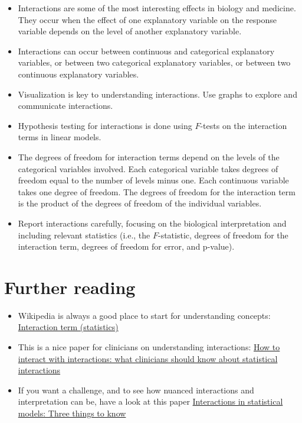 \documentclass[
  letterpaper,
  8pt,
  a4paper]{book}
\providecommand{\tightlist}{%
  \setlength{\itemsep}{0pt}\setlength{\parskip}{0pt}}
\begin{document}

\begin{itemize}
\tightlist
\item
  Interactions are some of the most interesting effects in biology and
  medicine. They occur when the effect of one explanatory variable on
  the response variable depends on the level of another explanatory
  variable.
\item
  Interactions can occur between continuous and categorical explanatory
  variables, or between two categorical explanatory variables, or
  between two continuous explanatory variables.
\item
  Visualization is key to understanding interactions. Use graphs to
  explore and communicate interactions.
\item
  Hypothesis testing for interactions is done using \(F\)-tests on the
  interaction terms in linear models.
\item
  The degrees of freedom for interaction terms depend on the levels of
  the categorical variables involved. Each categorical variable takes
  degrees of freedom equal to the number of levels minus one. Each
  continuous variable takes one degree of freedom. The degrees of
  freedom for the interaction term is the product of the degrees of
  freedom of the individual variables.
\item
  Report interactions carefully, focusing on the biological
  interpretation and including relevant statistics (i.e., the
  \(F\)-statistic, degrees of freedom for the interaction term, degrees
  of freedom for error, and p-value).
\end{itemize}

\section*{Further reading}\label{further-reading-5}


\begin{itemize}
\tightlist
\item
  Wikipedia is always a good place to start for understanding concepts:
  \href{https://en.wikipedia.org/wiki/Interaction_(statistics)}{Interaction
  term (statistics)}
\item
  This is a nice paper for clinicians on understanding interactions:
  \href{https://publications.aap.org/hospitalpediatrics/article/13/10/e319/194006/How-to-Interact-With-Interactions-What-Clinicians?autologincheck=redirected}{How
  to interact with interactions: what clinicians should know about
  statistical interactions}
\item
  If you want a challenge, and to see how nuanced interactions and
  interpretation can be, have a look at this paper
  \href{https://besjournals.onlinelibrary.wiley.com/doi/10.1111/2041-210X.13714}{Interactions
  in statistical models: Three things to know}
\end{itemize}
\end{document}
